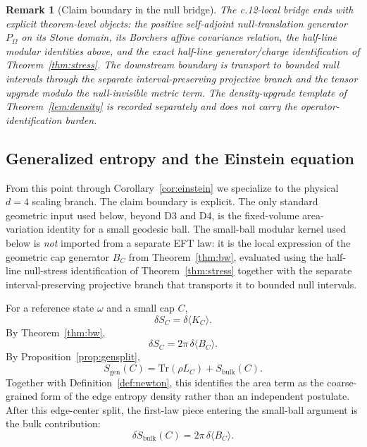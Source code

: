 \documentclass[11pt]{article}
\newtheorem{remark}[theorem]{Remark}
\begin{document}
\begin{remark}[Claim boundary in the null bridge]
The c.12-local bridge ends with explicit theorem-level objects: the positive self-adjoint null-translation generator \(P_\Omega\) on its Stone domain, its Borchers affine covariance relation, the half-line modular identities above, and the exact half-line generator/charge identification of Theorem~\ref{thm:stress}. The downstream boundary is transport to bounded null intervals through the separate interval-preserving projective branch and the tensor upgrade modulo the null-invisible metric term. The density-upgrade template of Theorem~\ref{lem:density} is recorded separately and does not carry the operator-identification burden.
\end{remark}
\subsection{Generalized entropy and the Einstein equation}

From this point through Corollary~\ref{cor:einstein} we specialize to the physical $d=4$ scaling branch. The claim boundary is explicit. The only standard geometric input used below, beyond D3 and D4, is the fixed-volume area-variation identity for a small geodesic ball. The small-ball modular kernel used below is \emph{not} imported from a separate EFT law: it is the local expression of the geometric cap generator $B_C$ from Theorem~\ref{thm:bw}, evaluated using the half-line null-stress identification of Theorem~\ref{thm:stress} together with the separate interval-preserving projective branch that transports it to bounded null intervals.

For a reference state $\omega$ and a small cap $C$,
\[
\delta S_C=\delta \langle K_C\rangle.
\]
By Theorem~\ref{thm:bw},
\[
\delta S_C = 2\pi\,\delta\langle B_C\rangle.
\]
By Proposition~\ref{prop:gensplit},
\[
S_{\mathrm{gen}}(C)=\mathrm{Tr}(\rho L_C)+S_{\mathrm{bulk}}(C).
\]
Together with Definition~\ref{def:newton}, this identifies the area term as the coarse-grained form of the edge entropy density rather than an independent postulate. After this edge-center split, the first-law piece entering the small-ball argument is the bulk contribution:
\[
\delta S_{\mathrm{bulk}}(C)=2\pi\,\delta\langle B_C\rangle.
\]
\end{document}
